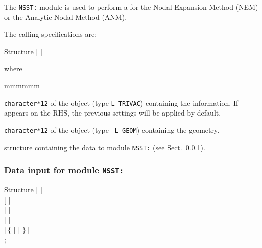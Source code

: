 The {\tt NSST:} module is used to perform a  for the Nodal
Expansion Method (NEM)\cite{nestle} or the Analytic Nodal Method (ANM)\cite{anm08}.

\vskip 0.08cm

The calling specifications are:

\begin{DataStructure}{Structure }
 \moc{:=}  $[$  $]$   \moc{::} 
\end{DataStructure}

\goodbreak
\noindent where
\begin{ListeDeDescription}{mmmmmm}

\item[\dusa{TRACK}] {\tt character*12} of the  object (type {\tt L\_TRIVAC}) 
containing the  information. If  appears on the RHS, the
previous settings will be applied by default.

\item[\dusa{GEOM}] {\tt character*12} of the  object (type {\tt
L\_GEOM}) containing the geometry.

\item[\dstr{NSST\_data}] structure containing the data to module {\tt NSST:} (see Sect.~\ref{sect:NSST_data}).

\end{ListeDeDescription}

\subsubsection{Data input for module {\tt NSST:}}\label{sect:NSST_data}

\begin{DataStructure}{Structure }
$[$   $]$ \\
$[$   $]$ \\
$[$   $]$ \\
$[$   $]$ \\
$[~\{$  $|$  $|$  $\}~]$ \\
;
\end{DataStructure}


